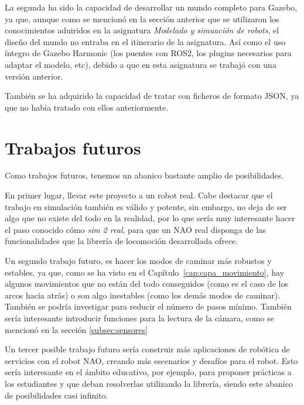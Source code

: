 La segunda ha sido la capacidad de desarrollar un mundo completo para Gazebo, ya que, aunque como se mencionó en la sección anterior que se utilizaron los conocimientos aduiridos en la asignatura \textit{Modelado y simuación de robots}, el diseño del mundo no entraba en el itinerario de la asignatura. Así como el uso íntegro de Gazebo Harmonic (los puentes con ROS2, los plugins necesarios para adaptar el modelo, etc), debido a que en esta asignatura se trabajó con una versión anterior.

También se ha adquirido la capacidad de tratar con ficheros de formato JSON, ya que no había tratado con ellos anteriormente.

\section{Trabajos futuros}

Como trabajos futuros, tenemos un abanico bastante amplio de posibilidades.

En primer lugar, llevar este proyecto a un robot real. Cabe destacar que el trabajo en simulación también es válido y potente, sin embargo, no deja de ser algo que no existe del todo en la realidad, por lo que sería muy interesante hacer el paso conocido cómo \textit{sim 2 real}, para que un NAO real disponga de las funcionalidades que la librería de locomoción desarrollada ofrece.

Un segundo trabajo futuro, es hacer los modos de caminar más robustos y estables, ya que, como se ha visto en el Capítulo~\ref{cap:capa_movimiento}, hay algunos movimientos que no están del todo conseguidos (como es el caso de los arcos hacia atrás) o son algo inestables (como los demás modos de caminar). También se podría investigar para reducir el número de pasos mínimo. También sería interesante introducir funciones para la lectura de la cámara, como se mencionó en la sección \ref{subsec:sensores}

Un tercer posible trabajo futuro sería construir más aplicaciones de robótica de servicios con el robot NAO, creando más escenarios y desafíos para el robot. Esto sería interesante en el ámbito educativo, por ejemplo, para proponer prácticas a los estudiantes y que deban resolverlas utilizando la librería, siendo este abanico de posibilidades casi infinito.
